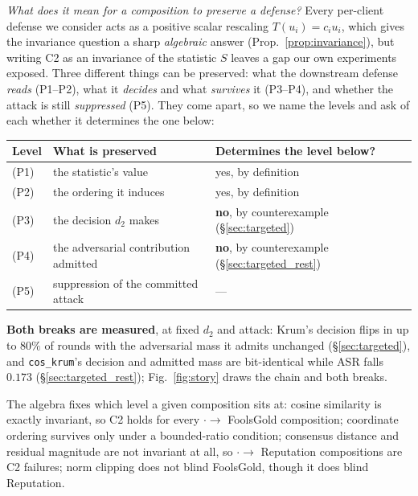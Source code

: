 \documentclass{article}
\begin{document}
\emph{What does it mean for a composition to preserve a defense?} Every per-client defense we consider acts as a positive scalar rescaling $T(u_i) = c_i u_i$, which gives the invariance question a sharp \emph{algebraic} answer (Prop.~\ref{prop:invariance}), but writing C2 as an invariance of the statistic $S$ leaves a gap our own experiments exposed. Three different things can be preserved: what the downstream defense \emph{reads} (P1--P2), what it \emph{decides} and what \emph{survives} it (P3--P4), and whether the attack is still \emph{suppressed} (P5). They come apart, so we name the levels and ask of each whether it determines the one below:

\begin{center}\small\vspace{-7pt}\setlength{\tabcolsep}{5pt}
\begin{tabular}{@{}lll@{}}
\toprule
Level & What is preserved & Determines the level below? \\
\midrule
(P1) & the statistic's value & yes, by definition \\
(P2) & the ordering it induces & yes, by definition \\
(P3) & the decision $d_2$ makes & \textbf{no}, by counterexample (\S\ref{sec:targeted}) \\
(P4) & the adversarial contribution admitted & \textbf{no}, by counterexample (\S\ref{sec:targeted_rest}) \\
(P5) & suppression of the committed attack & --- \\
\bottomrule
\end{tabular}
\vspace{-5pt}\end{center}

\noindent \textbf{Both breaks are measured}, at fixed $d_2$ and attack: Krum's decision flips in up to $80\%$ of rounds with the adversarial mass it admits unchanged (\S\ref{sec:targeted}), and \texttt{cos\_krum}'s decision and admitted mass are bit-identical while ASR falls $0.173$ (\S\ref{sec:targeted_rest}); Fig.~\ref{fig:story} draws the chain and both breaks.

The algebra fixes which level a given composition sits at: cosine similarity is exactly invariant, so C2 holds for every $\cdot \to$ FoolsGold composition; coordinate ordering survives only under a bounded-ratio condition; consensus distance and residual magnitude are not invariant at all, so $\cdot \to$ Reputation compositions are C2 failures; norm clipping does not blind FoolsGold, though it does blind Reputation.
\end{document}
